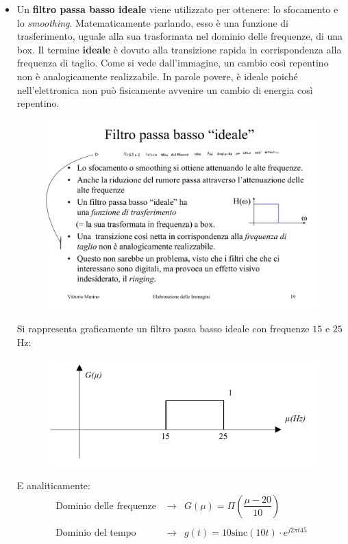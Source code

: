 \documentclass[a4paper]{article}
\begin{document}
\begin{itemize}
		\item Un \textbf{filtro passa basso ideale} viene utilizzato per ottenere: lo sfocamento e lo \emph{smoothing}. Matematicamente parlando, esso è una funzione di trasferimento, uguale alla sua trasformata nel dominio delle frequenze, di una box.\newline
		Il termine \textbf{ideale} è dovuto alla transizione rapida in corrispondenza alla frequenza di taglio. Come si vede dall'immagine, un cambio così repentino non è analogicamente realizzabile.\newline
		In parole povere, è ideale poiché nell'elettronica non può fisicamente avvenire un cambio di energia così repentino.\newline
		\begin{figure}[!htp]
			\centering
			\includegraphics[width=.35\textwidth]{img/box_filtro_passa_bassa_ideale.pdf}
		\end{figure}
			
		\noindent
		Si rappresenta graficamente un filtro passa basso ideale con frequenze $15$ e $25$ Hz:
		\begin{figure}[!htp]
			\centering
			\includegraphics[width=.8\textwidth]{img/filtro_passa_basso_ideale_ex.pdf}
		\end{figure}
		
		\noindent
		E analiticamente:
		\begin{equation*}
			\begin{array}{lll}
				\text{Dominio delle frequenze } & \longrightarrow & G\left(\mu\right) = \Pi\left(\dfrac{\mu - 20}{10}\right) \\
				&& \\
				\text{Dominio del tempo } & \longrightarrow & g\left(t\right) = 10\mathrm{sinc}\left(10t\right) \cdot e^{j 2 \pi t 45}
			\end{array}
		\end{equation*}
	\end{itemize}\newpage
	
\end{document}
